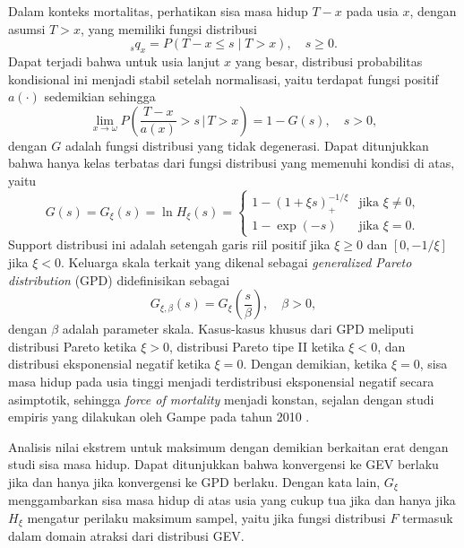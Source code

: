 Dalam konteks mortalitas, perhatikan sisa masa hidup $T - x$ pada usia $x$, dengan asumsi $T > x$, yang memiliki fungsi distribusi
\begin{equation}
    {}_sq_x = P(T - x \leq s \mid T > x), \quad s \geq 0.
\end{equation}
Dapat terjadi bahwa untuk usia lanjut $x$ yang besar, distribusi probabilitas kondisional ini menjadi stabil setelah normalisasi, yaitu terdapat fungsi positif $a(\cdot)$ sedemikian sehingga
\begin{equation}
    \lim_{x \to \omega} P\left(\frac{T - x}{a(x)} > s \,\bigg|\, T > x\right) = 1 - G(s), \quad s > 0,
\end{equation}
dengan $G$ adalah fungsi distribusi yang tidak degenerasi. Dapat ditunjukkan bahwa hanya kelas terbatas dari fungsi distribusi yang memenuhi kondisi di atas, yaitu
\begin{equation}
    G(s) = G_\xi(s) = \ln H_\xi(s) = \begin{cases}
        1 - (1 + \xi s)_+^{-1/\xi} & \text{jika } \xi \neq 0, \\
        1 - \exp(-s) & \text{jika } \xi = 0.
    \end{cases}
\end{equation}
Support distribusi ini adalah setengah garis riil positif jika $\xi \geq 0$ dan $[0, -1/\xi]$ jika $\xi < 0$. Keluarga skala terkait yang dikenal sebagai \textit{generalized Pareto distribution} (GPD) didefinisikan sebagai
\begin{equation}
    G_{\xi, \beta}(s) = G_\xi\left(\frac{s}{\beta}\right), \quad \beta > 0,
\end{equation}
dengan $\beta$ adalah parameter skala. Kasus-kasus khusus dari GPD meliputi distribusi Pareto ketika $\xi > 0$, distribusi Pareto tipe II ketika $\xi < 0$, dan distribusi eksponensial negatif ketika $\xi = 0$. Dengan demikian, ketika $\xi = 0$, sisa masa hidup pada usia tinggi menjadi terdistribusi eksponensial negatif secara asimptotik, sehingga \textit{force of mortality} menjadi konstan, sejalan dengan studi empiris yang dilakukan oleh Gampe pada tahun 2010 \citep{gampe2010human}.

Analisis nilai ekstrem untuk maksimum dengan demikian berkaitan erat dengan studi sisa masa hidup. Dapat ditunjukkan bahwa konvergensi ke GEV berlaku jika dan hanya jika konvergensi ke GPD berlaku. Dengan kata lain, $G_\xi$ menggambarkan sisa masa hidup di atas usia yang cukup tua jika dan hanya jika $H_\xi$ mengatur perilaku maksimum sampel, yaitu jika fungsi distribusi $F$ termasuk dalam domain atraksi dari distribusi GEV.

